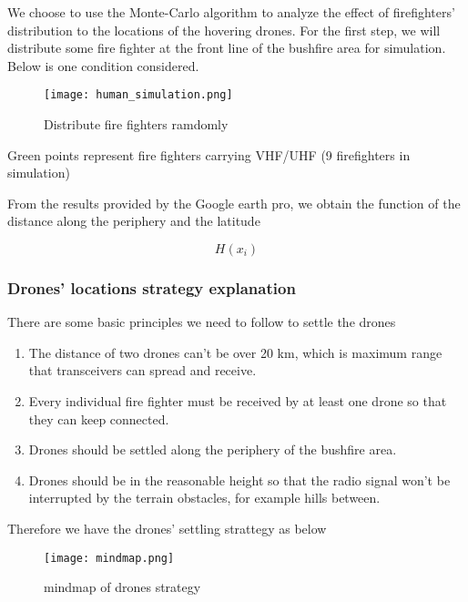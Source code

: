 \documentclass[../main]{subfiles}
\begin{document}
We choose to use the Monte-Carlo algorithm to analyze the effect of
firefighters' distribution to the locations of the hovering drones. For
the first step, we will distribute some fire fighter at the front line
of the bushfire area for simulation. Below is one condition considered.

\begin{figure}[h!]
      \centering
      \captionsetup{justification=centering}
      \texttt{[image: human\_simulation.png]}
      \caption{Distribute fire fighters ramdomly}
      \end{figure}
      
Green points represent fire fighters carrying VHF/UHF (9 firefighters in simulation)

From the results provided by the Google earth pro, we obtain the
function of the distance along the periphery and the latitude

\begin{equation}
H(x_i)
\end{equation}

\subsubsection{Drones' locations strategy explanation}

There are some basic principles we need to follow to settle the drones

\begin{enumerate}
\def\labelenumi{\arabic{enumi}.}
\item
  The distance of two drones can't be over 20 km, which is maximum range
  that transceivers can spread and receive.
\item
  Every individual fire fighter must be received by at least one drone
  so that they can keep connected.
\item
  Drones should be settled along the periphery of the bushfire area.
\item
  Drones should be in the reasonable height so that the radio signal
  won't be interrupted by the terrain obstacles, for example hills
  between.
\end{enumerate}

Therefore we have the drones' settling strattegy as below

\begin{figure}[h!]
      \centering
      \captionsetup{justification=centering}
      \texttt{[image: mindmap.png]}
      \caption{mindmap of drones strategy}
      \end{figure}
    
\end{document}
